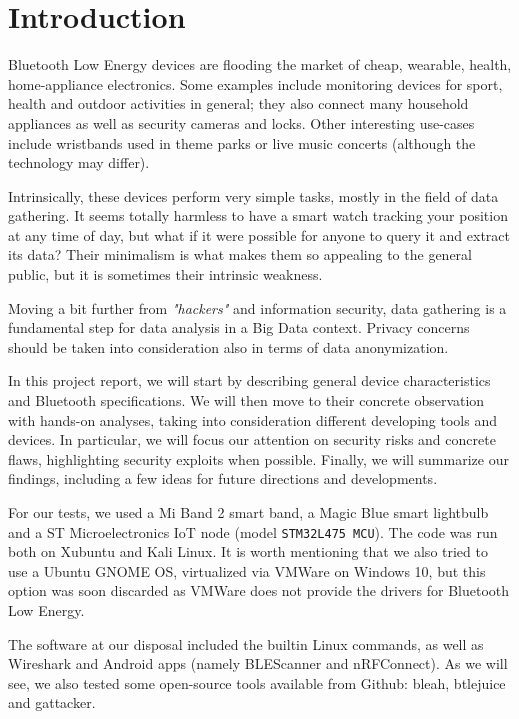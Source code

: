 \chapter{Introduction}
\label{Intro}
\thispagestyle{empty}

\noindent Bluetooth Low Energy devices are flooding the market of cheap, wearable, health, home-appliance electronics. Some examples include monitoring devices for sport, health and outdoor activities in general; they also connect many household appliances as well as security cameras and locks. Other interesting use-cases include wristbands used in theme parks or live music concerts (although the technology may differ).

Intrinsically, these devices perform very simple tasks, mostly in the field of data gathering. It seems totally harmless to have a smart watch tracking your position at any time of day, but what if it were possible for anyone to query it and extract its data? Their minimalism is what makes them so appealing to the general public, but it is sometimes their intrinsic weakness.

Moving a bit further from \textit{"hackers"} and information security, data gathering is a fundamental step for data analysis in a Big Data context. Privacy concerns should be taken into consideration also in terms of data anonymization.

In this project report, we will start by describing general device characteristics and Bluetooth specifications. We will then move to their concrete observation with hands-on analyses, taking into consideration different developing tools and devices. In particular, we will focus our attention on security risks and concrete flaws, highlighting security exploits when possible. Finally, we will summarize our findings, including a few ideas for future directions and developments.

For our tests, we used a Mi Band 2 smart band, a Magic Blue smart lightbulb and a ST Microelectronics IoT node (model \texttt{STM32L475 MCU}). The code was run both on Xubuntu and Kali Linux. It is worth mentioning that we also tried to use a Ubuntu GNOME OS, virtualized via VMWare on Windows 10, but this option was soon discarded as VMWare does not provide the drivers for Bluetooth Low Energy.

The software at our disposal included the builtin Linux commands, as well as Wireshark and Android apps (namely BLEScanner and nRFConnect). As we will see, we also tested some open-source tools available from Github: bleah, btlejuice and gattacker.